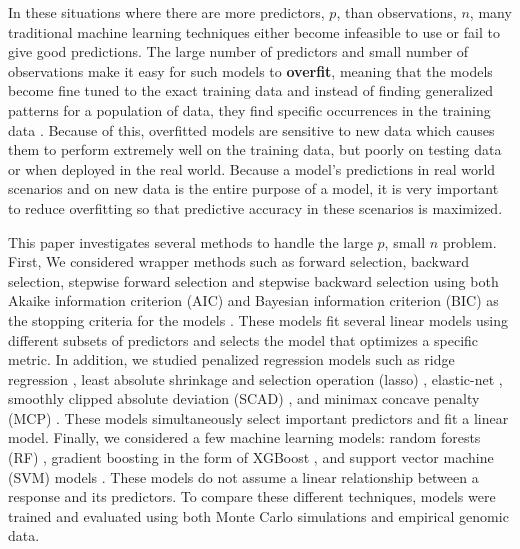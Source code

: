 \documentclass{article}
\begin{document}
	In these situations where there are more predictors, $p$, than observations, $n$, many traditional machine learning techniques either become infeasible to use or fail to give good predictions. The large number of predictors and small number of observations make it easy for such models to \textbf{overfit}, meaning that the models become fine tuned to the exact training data and instead of finding generalized patterns for a population of data, they find specific occurrences in the training data \cite{james2013introduction, friedman2001elements}. Because of this, overfitted models are sensitive to new data which causes them to perform extremely well on the training data, but poorly on testing data or when deployed in the real world. Because a model's predictions in real world scenarios and on new data is the entire purpose of a model, it is very important to reduce overfitting so that predictive accuracy in these scenarios is maximized.
	
	
	This paper investigates several methods to handle the large $p$, small $n$ problem. First, We considered wrapper methods such as forward selection, backward selection, stepwise forward selection and stepwise backward selection using both Akaike information criterion (AIC) and Bayesian information criterion (BIC) as the stopping criteria for the models \cite{akaike1998information, schwarz1978estimating}. These models fit several linear models using different subsets of predictors and selects the model that optimizes a specific metric. In addition, we studied penalized regression models such as ridge regression \cite{hoerl1970ridge}, least absolute shrinkage and selection operation (lasso) \cite{tibshirani1996regression}, elastic-net \cite{zou2005regularization}, smoothly clipped absolute deviation (SCAD) \cite{fan2001variable}, and minimax concave penalty (MCP) \cite{zhang2010nearly}. These models simultaneously select important predictors and fit a linear model. Finally, we considered a few machine learning models: random forests (RF) \cite{breiman2001random}, gradient boosting in the form of XGBoost \cite{chen2021xgboost}, and support vector machine (SVM) models \cite{cortes1995support}. These models do not assume a linear relationship between a response and its predictors. To compare these different techniques, models were trained and evaluated using both Monte Carlo simulations and empirical genomic data.
	
\end{document}
